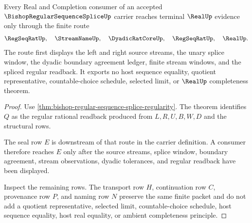 \begin{theorem}
\label{thm:bishop-regular-sequence-splice-real-seal}
Every Real and Completion consumer of an accepted $\BishopRegularSequenceSpliceUp$ carrier reaches terminal $\RealUp$ evidence only through the finite route
$$
\RegSeqRatUp,\quad \StreamNameUp,\quad \DyadicRatCoreUp,\quad \RegSeqRatUp,\quad \RealUp .
$$
The route first displays the left and right source streams, the unary splice window, the dyadic boundary agreement ledger, finite stream windows, and the spliced regular readback. It exports no host sequence equality, quotient representative, countable-choice schedule, selected limit, or $\RealUp$ completeness theorem.
\end{theorem}
\begin{proof}
Use \autoref{thm:bishop-regular-sequence-splice-regularity}. The theorem identifies $Q$ as the regular rational readback produced from $L,R,U,B,W,D$ and the structural rows.

The seal row $E$ is downstream of that route in the carrier definition. A consumer therefore reaches $E$ only after the source streams, splice window, boundary agreement, stream observations, dyadic tolerances, and regular readback have been displayed.

Inspect the remaining rows. The transport row $H$, continuation row $C$, provenance row $P$, and naming row $N$ preserve the same finite packet and do not add a quotient representative, selected limit, countable-choice schedule, host sequence equality, host real equality, or ambient completeness principle.
\end{proof}


\begin{closurestatus}{\BishopRegularSequenceSpliceUp}
  \theoryclosure{\seedClosure}
  \formalstatus{\unformalizedV}
\end{closurestatus}

